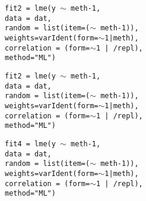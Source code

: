 \begin{frame}{\bf {}}
\begin{frame}{\bf {}}
\begin{itemize}
\begin{frame}{\bf {}}
{\bf {}}
\texttt{fit2 = lme(y $\sim$ meth-1,\\
   \hspace{0.6cm} data = dat,\\
   \hspace{0.6cm} random = list(item=($\sim$ meth-1)), \\
   \hspace{0.6cm} weights=varIdent(form=$\sim$1|meth),\\
   \hspace{0.6cm} correlation = (form=$\sim$1 | /repl),\\
   \hspace{0.6cm} method="ML")}

\end{frame}
\begin{frame}[fragile]{\bf {}}
\texttt{fit2 = lme(y $\sim$ meth-1,\\
   \hspace{0.6cm} data = dat,\\
   \hspace{0.6cm} random = list(item=($\sim$ meth-1)), \\
   \hspace{0.6cm} weights=varIdent(form=$\sim$1|meth),\\
   \hspace{0.6cm} correlation = (form=$\sim$1 | /repl),\\
   \hspace{0.6cm} method="ML")}
\end{frame}

\begin{frame}[fragile]{\bf {}}
\texttt{fit4 = lme(y $\sim$ meth-1,\\
   \hspace{0.6cm} data = dat,\\
   \hspace{0.6cm} random = list(item=($\sim$ meth-1)), \\
   \hspace{0.6cm} weights=varIdent(form=$\sim$1|meth),\\
   \hspace{0.6cm} correlation = (form=$\sim$1 | /repl),\\
   \hspace{0.6cm} method="ML")}
\end{frame}


\end{itemize}
\end{frame}
\end{frame}
